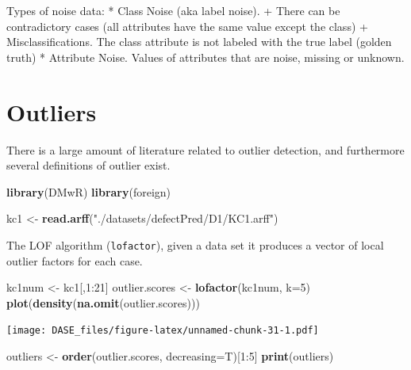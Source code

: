 \documentclass[]{book}
\newenvironment{Shaded}{\begin{snugshade}}{\end{snugshade}}
\newcommand{\KeywordTok}[1]{\textcolor[rgb]{0.13,0.29,0.53}{\textbf{{#1}}}}
\newcommand{\DataTypeTok}[1]{\textcolor[rgb]{0.13,0.29,0.53}{{#1}}}
\newcommand{\DecValTok}[1]{\textcolor[rgb]{0.00,0.00,0.81}{{#1}}}
\newcommand{\StringTok}[1]{\textcolor[rgb]{0.31,0.60,0.02}{{#1}}}
\newcommand{\NormalTok}[1]{{#1}}
\begin{document}
Types of noise data: * Class Noise (aka label noise). + There can be
contradictory cases (all attributes have the same value except the
class) + Misclassifications. The class attribute is not labeled with the
true label (golden truth) * Attribute Noise. Values of attributes that
are noise, missing or unknown.

\section{Outliers}\label{outliers}

There is a large amount of literature related to outlier detection, and
furthermore several definitions of outlier exist.

\begin{Shaded}
\begin{Highlighting}[]
\KeywordTok{library}\NormalTok{(DMwR)}
\KeywordTok{library}\NormalTok{(foreign)}

\NormalTok{kc1 <-}\StringTok{ }\KeywordTok{read.arff}\NormalTok{(}\StringTok{"./datasets/defectPred/D1/KC1.arff"}\NormalTok{)}
\end{Highlighting}
\end{Shaded}

The LOF algorithm (\texttt{lofactor}), given a data set it produces a
vector of local outlier factors for each case.

\begin{Shaded}
\begin{Highlighting}[]
\NormalTok{kc1num <-}\StringTok{ }\NormalTok{kc1[,}\DecValTok{1}\NormalTok{:}\DecValTok{21}\NormalTok{]}
\NormalTok{outlier.scores <-}\StringTok{ }\KeywordTok{lofactor}\NormalTok{(kc1num, }\DataTypeTok{k=}\DecValTok{5}\NormalTok{)}
\KeywordTok{plot}\NormalTok{(}\KeywordTok{density}\NormalTok{(}\KeywordTok{na.omit}\NormalTok{(outlier.scores)))}
\end{Highlighting}
\end{Shaded}

\texttt{[image: DASE\_files/figure-latex/unnamed-chunk-31-1.pdf]}

\begin{Shaded}
\begin{Highlighting}[]
\NormalTok{outliers <-}\StringTok{ }\KeywordTok{order}\NormalTok{(outlier.scores, }\DataTypeTok{decreasing=}\NormalTok{T)[}\DecValTok{1}\NormalTok{:}\DecValTok{5}\NormalTok{]}
\KeywordTok{print}\NormalTok{(outliers)}
\end{Highlighting}
\end{Shaded}
\end{document}
